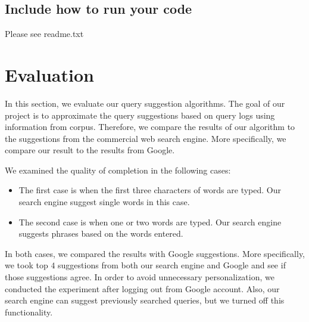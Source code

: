 \documentclass{article}
\begin{document}
\subsection{Include how to run your code}
Please see readme.txt

		

\section{Evaluation}

In this section, we evaluate our query suggestion algorithms. The goal of our project is to approximate the query suggestions based on query logs using information from corpus. Therefore, we compare the results of our algorithm to the suggestions from the commercial web search engine. More specifically, we compare our result to the results from Google. 

We examined the quality of completion in the following cases:
\begin{itemize}
\item The first case is when the first three characters of words are typed. Our search engine suggest single words in this case.
\item The second case is when one or two words are typed. Our search engine suggests phrases based on the words entered.
\end{itemize}
In both cases, we compared the results with Google suggestions. More specifically, we took top $4$ suggestions from both our search engine and Google and see if those suggestions agree. In order to avoid unnecessary personalization, we conducted the experiment after logging out from Google account. Also, our search engine can suggest previously searched queries, but we turned off this functionality.
\end{document}
